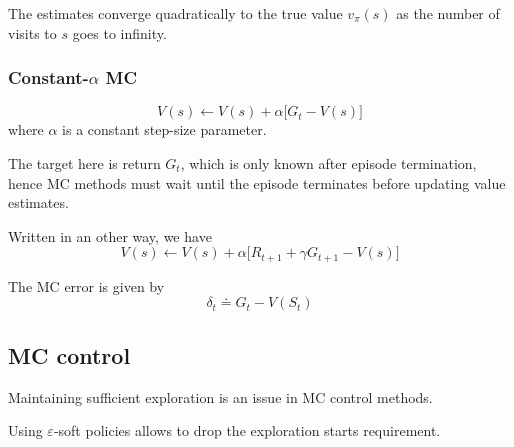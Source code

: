 The estimates converge quadratically to the true value \( v_\pi(s) \) as the number of visits to \( s \) goes to infinity.

\subsubsection{Constant-\texorpdfstring{\( \alpha \)}{alpha} MC}

\begin{equation}
    V(s) \leftarrow V(s) + \alpha \Big[ G_t - V(s) \Big]
\end{equation}
where \( \alpha \) is a constant step-size parameter.

The target here is return \( G_t \), which is only known after episode termination, hence MC methods must wait until the episode terminates before updating value estimates.

Written in an other way, we have
\begin{equation}\label{eq:mc-update-rule-2}
    V(s) \leftarrow V(s) + \alpha \Big[ R_{t+1} + \gamma G_{t+1} - V(s) \Big]
\end{equation}

The MC error is given by
\begin{equation}\label{eq:mc-error}
    \delta_t \doteq G_t - V(S_t)
\end{equation}

\subsection{MC control}

Maintaining sufficient exploration is an issue in MC control methods.

Using \( \varepsilon \)-soft policies allows to drop the exploration starts requirement.
